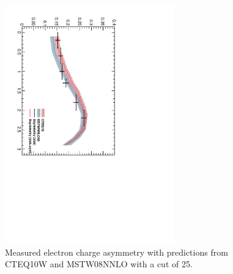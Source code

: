 \begin{figure}[htbp]
  \begin{center}
  \includegraphics*[width=0.65\textwidth,angle=90]{Asym_25}
  \caption[Measured electron charge asymmetry with a \pT cut of
\unit{25}{\GeV}]{\label{fig:asym25} Measured electron charge asymmetry with
predictions from CTEQ10W and MSTW08NNLO with a \pT cut of
\unit{25}{\GeV}\cite{baisini2010electron}.}
  \end{center}
\end{figure}


